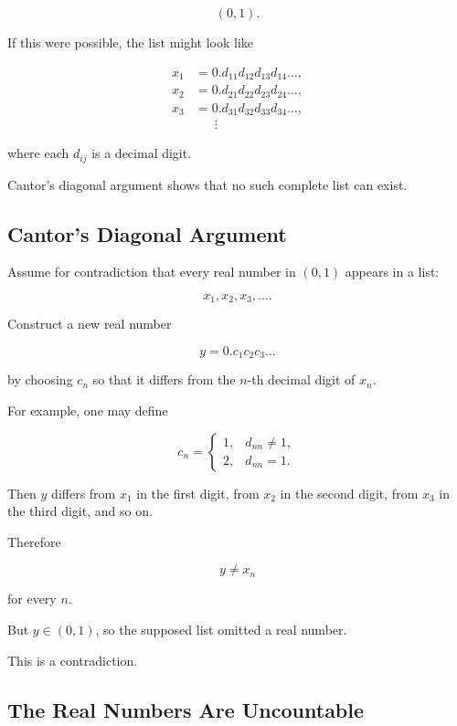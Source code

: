 \[ (0,1). \]

If this were possible, the list might look like

\[
\begin{aligned}
x_1&=0.d_{11}d_{12}d_{13}d_{14}\ldots,\\
x_2&=0.d_{21}d_{22}d_{23}d_{24}\ldots,\\
x_3&=0.d_{31}d_{32}d_{33}d_{34}\ldots,\\
&\phantom{=}~\vdots
\end{aligned}
\]

where each \(d_{ij}\) is a decimal digit.

Cantor's diagonal argument shows that no such complete list can exist.

\subsection{Cantor's Diagonal Argument}
\label{subsec:cantor-diagonal}

Assume for contradiction that every real number in \((0,1)\) appears in a
list:

\[ x_1,x_2,x_3,\ldots. \]

Construct a new real number

\[ y=0.c_1c_2c_3\ldots \]

by choosing \(c_n\) so that it differs from the \(n\)-th decimal digit of
\(x_n\).

For example, one may define

\[ c_n=
\begin{cases}
1,&d_{nn}\neq1,\\
2,&d_{nn}=1.
\end{cases} \]

Then \(y\) differs from \(x_1\) in the first digit, from \(x_2\) in the second
digit, from \(x_3\) in the third digit, and so on.

Therefore

\[ y\neq x_n \]

for every \(n\).

But \(y\in(0,1)\), so the supposed list omitted a real number.

This is a contradiction.

\subsection{The Real Numbers Are Uncountable}
\label{subsec:reals-uncountable}

